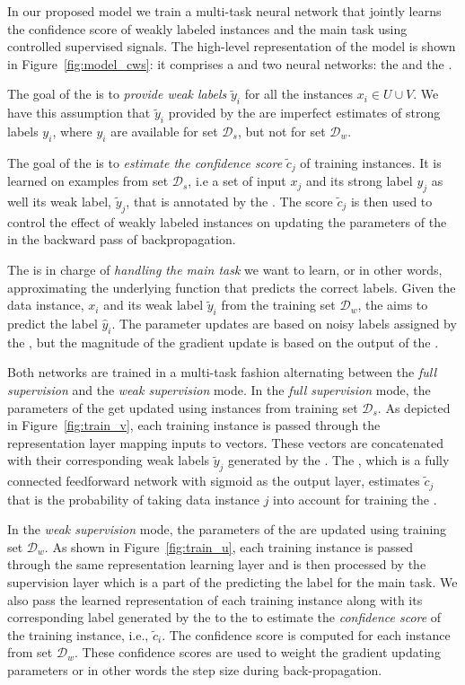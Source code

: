 In our proposed model we train a multi-task neural network that jointly learns the confidence score of weakly labeled instances and the main task using controlled supervised signals.
%
The high-level representation of the model is shown in Figure~\ref{fig:model_cws}: it comprises a \wa and two neural networks: the \cnet and the \tnet. 

The goal of the \wa is to \emph{provide weak labels} $\tilde{y}_i$ for all the instances $x_i \in U \cup V$. We have this assumption that $\tilde{y}_i$ provided by the \wa are imperfect estimates of strong labels $y_i$, where $y_i$ are available for set $\mathcal{D}_s$, but not for set $\mathcal{D}_w$.

The goal of the \cnet is to \emph{estimate the confidence score} $\tilde{c}_j$ of training instances. It is learned on examples from set $\mathcal{D}_s$, i.e a set of input $x_j$ and its strong label $y_j$ as well its weak label,  $\tilde{y}_j$,  that is annotated by the \wa.
The score $\tilde{c}_j$ is then used to control the effect of weakly labeled instances on updating the parameters of the \tnet in the backward pass of backpropagation.

The \tnet is in charge of \emph{handling the main task} we want to learn, or in other words, approximating the underlying function that predicts the correct labels. 
Given the data instance, $x_i$ and its weak label $\tilde{y}_i$ from the training set $\mathcal{D}_w$, the \tnet aims to predict the label $\hat{y}_i$. 
The \tnet parameter updates are based on noisy labels assigned by the \wa, but the magnitude of the gradient update is based on the output of the \cnet. 

Both networks are trained in a multi-task fashion alternating between the \emph{full supervision} and the \emph{weak supervision} mode.  
In the \emph{full supervision} mode, the parameters of the \cnet get updated using instances from training set $\mathcal{D}_s$.  
As depicted in Figure~\ref{fig:train_v}, each training instance is passed through the representation layer mapping inputs to vectors. These vectors are concatenated with their corresponding weak labels $\tilde{y}_j$ generated by the \wa.
The \cnet, which is a fully connected feedforward network with sigmoid as the output layer, estimates $\tilde{c}_j$ that is the probability of taking data instance $j$ into account for training the \tnet.

In the \emph{weak supervision} mode, the parameters of the \tnet are updated using training set $\mathcal{D}_w$.
As shown in Figure~\ref{fig:train_u}, each training instance is passed through the same representation learning layer and is then processed by the supervision layer which is a part of the \tnet predicting the label for the main task. 
%
We also pass the learned representation of each training instance along with its corresponding label generated by the \wa to the \cnet to estimate the \emph{confidence score} of the training instance, i.e., $\tilde{c}_i$. 
The confidence score is computed for each instance from set $\mathcal{D}_w$. These confidence scores are used to weight the gradient updating \tnet parameters or in other words the step size during back-propagation. 

